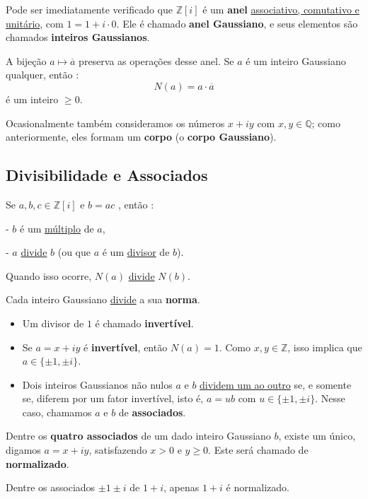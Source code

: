 Pode ser imediatamente verificado que $\mathbb{Z}[i]$ é um \textbf{anel} \underline{associativo, comutativo e unitário}, com 
$1 = 1 + i \cdot 0$. Ele é chamado \textbf{anel Gaussiano}, e seus elementos são chamados 
\textbf{inteiros Gaussianos}.  

A bijeção $a \mapsto \overline{a}$ preserva as operações desse anel.  
Se $a$ é um inteiro Gaussiano qualquer, então :
\[
N(a) = a \cdot \overline{a}
\]
é um inteiro $\geq 0$.  

Ocasionalmente também consideramos os números $x + iy$ com $x, y \in \mathbb{Q}$; como anteriormente, 
eles formam um \textbf{corpo} (o \textbf{corpo Gaussiano}).  

\subsection*{Divisibilidade e Associados}

Se $a, b, c \in \mathbb{Z}[i]$ e $b = ac$ , então : 

- $b$ é um \underline{múltiplo} de $a$, 

- $a$ \underline{divide} $b$ (ou que $a$ é um \underline{divisor} de $b$).  

\noindent Quando isso ocorre, $N(a)$ \underline{divide} $N(b)$.  

\noindent Cada inteiro Gaussiano \underline{divide} a sua \textbf{norma}.  

\begin{itemize}
    \item Um divisor de $1$ é chamado \textbf{invertível}.  
    \item Se $a = x + iy$ é \textbf{invertível}, então $N(a) = 1$. Como $x, y \in \mathbb{Z}$, isso implica que $a \in \{\pm 1, \pm i\}$.  
    \item Dois inteiros Gaussianos não nulos $a$ e $b$ \underline{dividem um ao outro} se, e somente se, diferem por um fator invertível, isto é, $a = ub$ com $u \in \{\pm 1, \pm i\}$. Nesse caso, chamamos $a$ e $b$ de \textbf{associados}.  
\end{itemize}

Dentre os \textbf{quatro associados} de um dado inteiro Gaussiano $b$, existe um único, digamos $a = x + iy$, satisfazendo $x > 0$ e $y \geq 0$. Este será chamado de \textbf{normalizado}.  

\begin{exemplo}
Dentre os associados $\pm 1 \pm i$ de $1+i$, apenas $\boxed{1+i}$ é normalizado.      
\end{exemplo}

